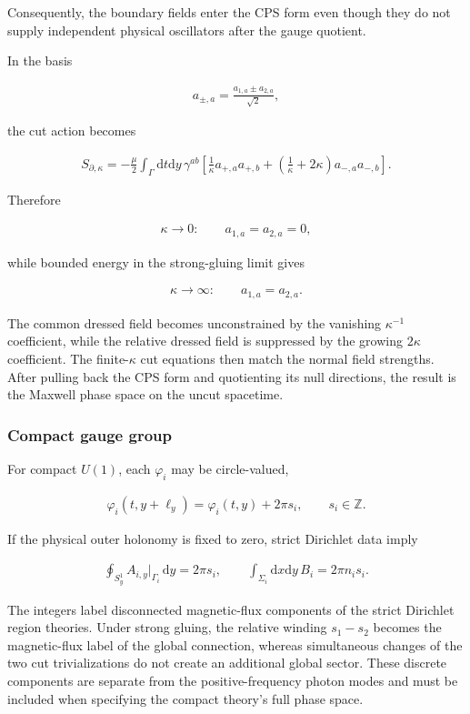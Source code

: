 Consequently, the boundary fields enter the CPS form even though they do not supply independent physical oscillators after the gauge quotient.

In the basis

\begin{align}
a_{\pm,a}=\frac{a_{1,a}\pm a_{2,a}}{\sqrt2},
\end{align}

the cut action becomes

\begin{align}
S_{\partial,\kappa}
=-\frac\mu2\int_\Gamma\mathrm dt\mathrm dy\,
\gamma^{ab}\left[
\frac1\kappa a_{+,a}a_{+,b}
+\left(\frac1\kappa+2\kappa\right)a_{-,a}a_{-,b}
\right].
\end{align}

Therefore

\begin{align}
\kappa\to0:
\qquad
a_{1,a}=a_{2,a}=0,
\end{align}

while bounded energy in the strong-gluing limit gives

\begin{align}
\kappa\to\infty:
\qquad
a_{1,a}=a_{2,a}.
\end{align}

The common dressed field becomes unconstrained by the vanishing $\kappa^{-1}$ coefficient, while the relative dressed field is suppressed by the growing $2\kappa$ coefficient. The finite-$\kappa$ cut equations then match the normal field strengths. After pulling back the CPS form and quotienting its null directions, the result is the Maxwell phase space on the uncut spacetime.

\subsubsection{Compact gauge group}\label{compact-gauge-group}

For compact $U(1)$, each $\varphi_i$ may be circle-valued,

\begin{align}
\varphi_i(t,y+\ell_y)
=\varphi_i(t,y)+2\pi s_i,
\qquad
s_i\in\mathbb Z.
\end{align}

If the physical outer holonomy is fixed to zero, strict Dirichlet data imply

\begin{align}
\oint_{S_y^1}A_{i,y}\big|_{\Gamma_i}\,\mathrm dy=2\pi s_i,
\qquad
\int_{\Sigma_i}\mathrm dx\mathrm dy\,B_i=2\pi n_i s_i.
\end{align}

The integers label disconnected magnetic-flux components of the strict Dirichlet region theories. Under strong gluing, the relative winding $s_1-s_2$ becomes the magnetic-flux label of the global connection, whereas simultaneous changes of the two cut trivializations do not create an additional global sector. These discrete components are separate from the positive-frequency photon modes and must be included when specifying the compact theory's full phase space.
